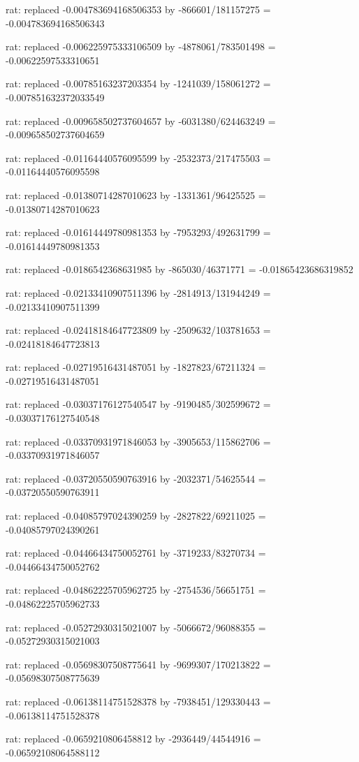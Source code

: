 \documentclass[a4paper,10pt]{article}
\begin{document}
\begin{eulernotebook}
\begin{eulercomment}
\begin{eulercomment}
\begin{eulercomment}
\begin{eulercomment}
\begin{eulercomment}
\begin{eulercomment}
\begin{eulercomment}
\begin{eulercomment}
\begin{eulercomment}
\begin{eulercomment}
\begin{eulercomment}
\begin{eulercomment}
\begin{eulercomment}
\begin{eulercomment}
\begin{eulercomment}
\begin{eulercomment}
\begin{euleroutput}
  rat: replaced -0.004783694168506353 by -866601/181157275 = -0.004783694168506343
  
  rat: replaced -0.006225975333106509 by -4878061/783501498 = -0.00622597533310651
  
  rat: replaced -0.00785163237203354 by -1241039/158061272 = -0.007851632372033549
  
  rat: replaced -0.009658502737604657 by -6031380/624463249 = -0.009658502737604659
  
  rat: replaced -0.01164440576095599 by -2532373/217475503 = -0.01164440576095598
  
  rat: replaced -0.01380714287010623 by -1331361/96425525 = -0.01380714287010623
  
  rat: replaced -0.01614449780981353 by -7953293/492631799 = -0.01614449780981353
  
  rat: replaced -0.0186542368631985 by -865030/46371771 = -0.01865423686319852
  
  rat: replaced -0.02133410907511396 by -2814913/131944249 = -0.02133410907511399
  
  rat: replaced -0.02418184647723809 by -2509632/103781653 = -0.02418184647723813
  
  rat: replaced -0.02719516431487051 by -1827823/67211324 = -0.02719516431487051
  
  rat: replaced -0.03037176127540547 by -9190485/302599672 = -0.03037176127540548
  
  rat: replaced -0.03370931971846053 by -3905653/115862706 = -0.03370931971846057
  
  rat: replaced -0.03720550590763916 by -2032371/54625544 = -0.03720550590763911
  
  rat: replaced -0.04085797024390259 by -2827822/69211025 = -0.04085797024390261
  
  rat: replaced -0.04466434750052761 by -3719233/83270734 = -0.04466434750052762
  
  rat: replaced -0.04862225705962725 by -2754536/56651751 = -0.04862225705962733
  
  rat: replaced -0.05272930315021007 by -5066672/96088355 = -0.05272930315021003
  
  rat: replaced -0.05698307508775641 by -9699307/170213822 = -0.05698307508775639
  
  rat: replaced -0.06138114751528378 by -7938451/129330443 = -0.06138114751528378
  
  rat: replaced -0.0659210806458812 by -2936449/44544916 = -0.06592108064588112
  

\end{euleroutput}
\end{eulercomment}
\end{eulercomment}
\end{eulercomment}
\end{eulercomment}
\end{eulercomment}
\end{eulercomment}
\end{eulercomment}
\end{eulercomment}
\end{eulercomment}
\end{eulercomment}
\end{eulercomment}
\end{eulercomment}
\end{eulercomment}
\end{eulercomment}
\end{eulercomment}
\end{eulercomment}
\end{eulernotebook}
\end{document}
